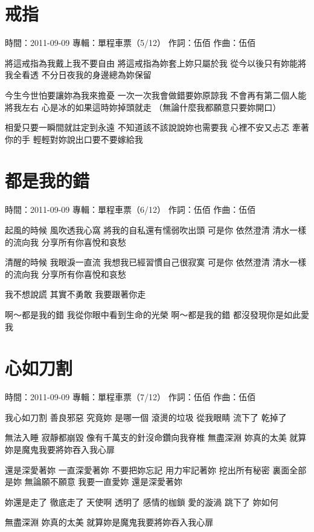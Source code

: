 \documentclass[UTF8,a4paper,oneside,twocolumn,12pt]{ctexbook}
\newcommand{\infopair}[2]{\textbullet #1：#2}
\newcommand{\zc}[1][伍佰]{\infopair{作詞}{#1}}
\newcommand{\zq}[1][伍佰]{\infopair{作曲}{#1}}
\newcommand{\zj}[1]{\infopair{專輯}{#1}}
\newcommand{\sj}[1]{\infopair{時間}{#1}}
\newenvironment{info}{\begin{flushleft}\kaishu
	}
	{\end{flushleft}\normalsize\yahei\par}
\newenvironment{lyric}{
	}
{}
\begin{document}
\section{戒指}
\begin{info}
	\sj{2011-09-09}
	\zj{單程車票（5/12）}
	\zc
	\zq
\end{info}
\begin{lyric}
	將這戒指為我戴上我不要自由
	將這戒指為妳套上妳只屬於我
	從今以後只有妳能將我全看透
	不分日夜我的身邊總為妳保留

	今生今世怕要讓妳為我來擔憂
	一次一次我會做錯要妳原諒我
	不會再有第二個人能將我左右
	心是冰的如果這時妳掉頭就走
	（無論什麼我都願意只要妳開口）

	相愛只要一瞬間就註定到永遠
	不知道該不該說說妳也需要我
	心裡不安又忐忑 牽著你的手
	輕輕對妳說出口要不要嫁給我
\end{lyric}

\section{都是我的錯}
\begin{info}
	\sj{2011-09-09}
	\zj{單程車票（6/12）}
	\zc
	\zq
\end{info}
\begin{lyric}
	起風的時候 風吹透我心窩
	將我的自私還有懦弱吹出頭
	可是你 依然澄清
	清水一樣的流向我
	分享所有你喜悅和哀愁

	清醒的時候 我眼淚一直流
	我想我已經習慣自己很寂寞
	可是你 依然澄清
	清水一樣的流向我
	分享所有你喜悅和哀愁

	我不想說謊
	其實不勇敢
	我要跟著你走

	啊～都是我的錯
	我從你眼中看到生命的光榮
	啊～都是我的錯
	都沒發現你是如此愛我
\end{lyric}

\section{心如刀割}
\begin{info}
	\sj{2011-09-09}
	\zj{單程車票（7/12）}
	\zc
	\zq
\end{info}
\begin{lyric}
	我心如刀割 善良邪惡 究竟妳 是哪一個
	滾燙的垃圾 從我眼睛 流下了 乾掉了

	無法入睡 寂靜都崩毀
	像有千萬支的針沒命鑽向我脊椎
	無盡深淵 妳真的太美
	就算妳是魔鬼我要將妳吞入我心扉

	還是深愛著妳 一直深愛著妳
	不要把妳忘記 用力牢記著妳
	挖出所有秘密 裏面全部是妳
	無論願不願意 我要一直愛妳
	還是深愛著妳

	妳還是走了 徹底走了 天使啊 透明了
	感情的枷鎖 愛的漩渦 跳下了 妳如何

	無盡深淵 妳真的太美
	就算妳是魔鬼我要將妳吞入我心扉
\end{lyric}
\end{document}
